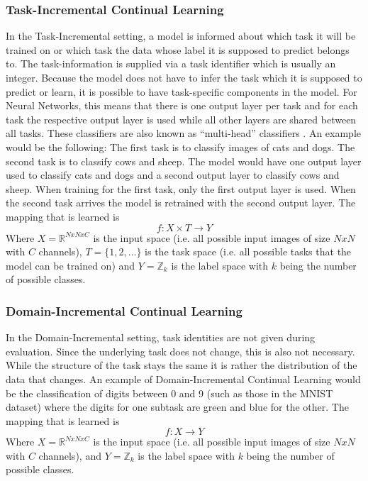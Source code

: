 \subsubsection{Task-Incremental Continual Learning}
\label{sec:TaskIncrementalContinualLearning}
In the Task-Incremental setting, a model is informed about which task it will be trained on or which task the data whose label it is supposed to predict belongs to.
The task-information is supplied via a task identifier which is usually an integer. Because the model does not have to infer the task which it is supposed to predict
or learn, it is possible to have task-specific components in the model. For Neural Networks, this means that there is one output layer per task and for each task the
respective output layer is used while all other layers are shared between all tasks. These classifiers are also known as \enquote{multi-head} classifiers \cite{van2018generative}.
An example would be the following: The first task is to classify images of cats and dogs. The second task is to classify cows and sheep. The model would have one output layer 
used to classify cats and dogs and a second output layer to classify cows and sheep. When training for the first task, only the first output layer is used. When the second task
arrives the model is retrained with the second output layer.  The mapping that is learned is 
\begin{equation}
    f: X \times T \rightarrow Y
\end{equation}
Where $X = \mathbb{R}^{N x N x C}$ is the input space (i.e. all possible input images of size $N x N$ with $C$ channels), $T = \{1,2,\ldots\}$ is the task space (i.e. all possible
tasks that the model can be trained on) and $Y = \mathbb{Z}_{k}$ is the label space with $k$ being the number of possible classes.
\subsubsection{Domain-Incremental Continual Learning}
\label{sec:DomainIncrementalContinualLearning}
In the Domain-Incremental setting, task identities are not given during evaluation. Since the underlying task does not change, this is also not necessary. While the structure of the task
stays the same it is rather the distribution of the data that changes. An example of Domain-Incremental Continual Learning would be the classification of digits between 0 and 9 (such as
those in the MNIST \cite{mnist_web} dataset) where the digits for one subtask are green and blue for the other. The mapping that is learned is 
\begin{equation}
    f: X \rightarrow Y
\end{equation}
Where $X = \mathbb{R}^{N x N x C}$ is the input space (i.e. all possible input images of size $N x N$ with $C$ channels), and $Y = \mathbb{Z}_{k}$ is the label space with $k$ being the
number of possible classes.

